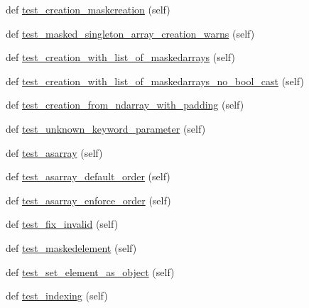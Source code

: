 \begin{DoxyCompactItemize}
\item 
def \hyperlink{classnumpy_1_1ma_1_1tests_1_1test__core_1_1TestMaskedArray_a9d207361ca093bb8a5c488846c94f373}{test\+\_\+creation\+\_\+maskcreation} (self)
\item 
def \hyperlink{classnumpy_1_1ma_1_1tests_1_1test__core_1_1TestMaskedArray_a0760ae98365c7b4619942786093c83c3}{test\+\_\+masked\+\_\+singleton\+\_\+array\+\_\+creation\+\_\+warns} (self)
\item 
def \hyperlink{classnumpy_1_1ma_1_1tests_1_1test__core_1_1TestMaskedArray_a6ecc5b39c181a9df9035183b08b556f1}{test\+\_\+creation\+\_\+with\+\_\+list\+\_\+of\+\_\+maskedarrays} (self)
\item 
def \hyperlink{classnumpy_1_1ma_1_1tests_1_1test__core_1_1TestMaskedArray_a3f6d9f0aae9736206bee064c35638cb7}{test\+\_\+creation\+\_\+with\+\_\+list\+\_\+of\+\_\+maskedarrays\+\_\+no\+\_\+bool\+\_\+cast} (self)
\item 
def \hyperlink{classnumpy_1_1ma_1_1tests_1_1test__core_1_1TestMaskedArray_a493ababefb7dd1bbadc1c94c46af4698}{test\+\_\+creation\+\_\+from\+\_\+ndarray\+\_\+with\+\_\+padding} (self)
\item 
def \hyperlink{classnumpy_1_1ma_1_1tests_1_1test__core_1_1TestMaskedArray_a47cdd8e2065133819eba60ed08775aef}{test\+\_\+unknown\+\_\+keyword\+\_\+parameter} (self)
\item 
def \hyperlink{classnumpy_1_1ma_1_1tests_1_1test__core_1_1TestMaskedArray_a72e953bb14dc2d56b2d3d33bd5a10a05}{test\+\_\+asarray} (self)
\item 
def \hyperlink{classnumpy_1_1ma_1_1tests_1_1test__core_1_1TestMaskedArray_a5eb396c4549a04c7f26c3ed0e6a43125}{test\+\_\+asarray\+\_\+default\+\_\+order} (self)
\item 
def \hyperlink{classnumpy_1_1ma_1_1tests_1_1test__core_1_1TestMaskedArray_a7842bd702bfe4e0adcaac868d3b481cd}{test\+\_\+asarray\+\_\+enforce\+\_\+order} (self)
\item 
def \hyperlink{classnumpy_1_1ma_1_1tests_1_1test__core_1_1TestMaskedArray_aecde6b6d47aa55ae14403439373a4bef}{test\+\_\+fix\+\_\+invalid} (self)
\item 
def \hyperlink{classnumpy_1_1ma_1_1tests_1_1test__core_1_1TestMaskedArray_a63242da98a119f584cfd8611186f7c53}{test\+\_\+maskedelement} (self)
\item 
def \hyperlink{classnumpy_1_1ma_1_1tests_1_1test__core_1_1TestMaskedArray_acc1888c6c4ee6741eaff684da50a78a7}{test\+\_\+set\+\_\+element\+\_\+as\+\_\+object} (self)
\item 
def \hyperlink{classnumpy_1_1ma_1_1tests_1_1test__core_1_1TestMaskedArray_a46eff60329f2bd064e825417b6b59276}{test\+\_\+indexing} (self)

\end{DoxyCompactItemize}
